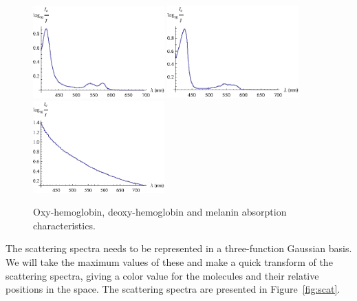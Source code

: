\begin{figure}[h!]
  \centering
    \includegraphics[width=0.45\textwidth]{Chapter2/Figs/absOxyHemo.eps}
    \includegraphics[width=0.45\textwidth]{Chapter2/Figs/absDeoxyHemo.eps}
    \includegraphics[width=0.45\textwidth]{Chapter2/Figs/absMelanin.eps}
    \caption{Oxy-hemoglobin, deoxy-hemoglobin and melanin absorption characteristics.}  \label{fig:abs}
\end{figure}

The scattering spectra needs to be represented in a three-function Gaussian basis. We will take the maximum values of these and make a quick transform of the scattering spectra, giving a color value for the molecules and their relative positions in the space. The scattering spectra are presented in Figure~\ref{fig:scat}.

